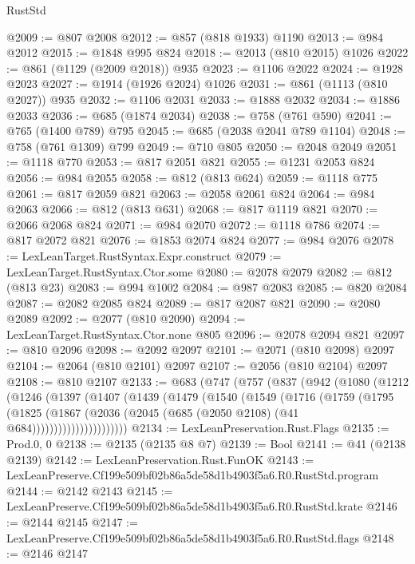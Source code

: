 \begin{lexlean}{RustStd}
\begin{coremodule}
@2009 := @807 @2008
@2012 := @857 (@818 @1933) @1190
@2013 := @984 @2012
@2015 := @1848 @995 @824
@2018 := @2013 (@810 @2015) @1026
@2022 := @861 (@1129 (@2009 @2018)) @935
@2023 := @1106 @2022
@2024 := @1928 @2023
@2027 := @1914 (@1926 @2024) @1026
@2031 := @861 (@1113 (@810 @2027)) @935
@2032 := @1106 @2031
@2033 := @1888 @2032
@2034 := @1886 @2033
@2036 := @685 (@1874 @2034)
@2038 := @758 (@761 @590)
@2041 := @765 (@1400 @789) @795
@2045 := @685 (@2038 @2041 @789 @1104)
@2048 := @758 (@761 @1309) @799
@2049 := @710 @805
@2050 := @2048 @2049
@2051 := @1118 @770
@2053 := @817 @2051 @821
@2055 := @1231 @2053 @824
@2056 := @984 @2055
@2058 := @812 (@813 @624)
@2059 := @1118 @775
@2061 := @817 @2059 @821
@2063 := @2058 @2061 @824
@2064 := @984 @2063
@2066 := @812 (@813 @631)
@2068 := @817 @1119 @821
@2070 := @2066 @2068 @824
@2071 := @984 @2070
@2072 := @1118 @786
@2074 := @817 @2072 @821
@2076 := @1853 @2074 @824
@2077 := @984 @2076
@2078 := LexLeanTarget.RustSyntax.Expr.construct
@2079 := LexLeanTarget.RustSyntax.Ctor.some
@2080 := @2078 @2079
@2082 := @812 (@813 @23)
@2083 := @994 @1002
@2084 := @987 @2083
@2085 := @820 @2084
@2087 := @2082 @2085 @824
@2089 := @817 @2087 @821
@2090 := @2080 @2089
@2092 := @2077 (@810 @2090)
@2094 := LexLeanTarget.RustSyntax.Ctor.none @805
@2096 := @2078 @2094 @821
@2097 := @810 @2096
@2098 := @2092 @2097
@2101 := @2071 (@810 @2098) @2097
@2104 := @2064 (@810 @2101) @2097
@2107 := @2056 (@810 @2104) @2097
@2108 := @810 @2107
@2133 := @683
    (@747
      (@757
        (@837
          (@942
            (@1080
              (@1212
                (@1246
                  (@1397
                    (@1407
                      (@1439
                        (@1479
                          (@1540
                            (@1549
                              (@1716
                                (@1759
                                  (@1795
                                    (@1825
                                      (@1867
                                        (@2036
                                          (@2045 (@685 (@2050 @2108) (@41 @684))))))))))))))))))))))
@2134 := LexLeanPreservation.Rust.Flags
@2135 := Prod.{0, 0}
@2138 := @2135 (@2135 @8 @7)
@2139 := Bool
@2141 := @41 (@2138 @2139)
@2142 := LexLeanPreservation.Rust.FunOK
@2143 := LexLeanPreserve.Cf199e509bf02b86a5de58d1b4903f5a6.R0.RustStd.program
@2144 := @2142 @2143
@2145 := LexLeanPreserve.Cf199e509bf02b86a5de58d1b4903f5a6.R0.RustStd.krate
@2146 := @2144 @2145
@2147 := LexLeanPreserve.Cf199e509bf02b86a5de58d1b4903f5a6.R0.RustStd.flags
@2148 := @2146 @2147

\end{coremodule}
\end{lexlean}
